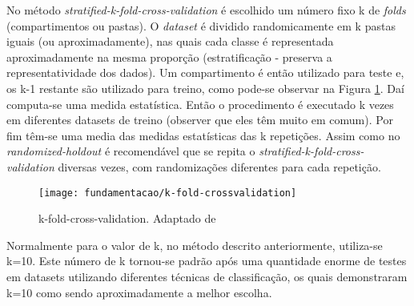 No método \textit{stratified-k-fold-cross-validation} é escolhido um número fixo k de \textit{folds} (compartimentos ou pastas). O \textit{dataset} é dividido randomicamente em k pastas iguais (ou aproximadamente), nas quais cada classe é representada aproximadamente na mesma proporção (estratificação - preserva a representatividade dos dados). 
Um compartimento é então utilizado para teste e, os k-1 restante são utilizado para treino, como pode-se observar na Figura \ref{fig:kfoldcrossvalidation}. Daí computa-se uma medida estatística. Então o procedimento é executado k vezes em diferentes datasets de treino (observer que eles têm muito em comum). Por fim têm-se uma media das medidas estatísticas das k repetições. Assim como no \textit{randomized-holdout} é recomendável que se repita o \textit{stratified-k-fold-cross-validation} diversas vezes, com randomizações diferentes para cada repetição.\cite{Witten:2005}

\begin{figure}[!htb] \centering 
  \centering
  \texttt{[image: fundamentacao/k-fold-crossvalidation]} 
  \caption{k-fold-cross-validation. Adaptado de\cite{Keller}} 
  \label{fig:kfoldcrossvalidation}
\end{figure}

Normalmente para o valor de k, no método descrito anteriormente, utiliza-se k=10. Este número de k tornou-se padrão após uma quantidade enorme de testes em datasets utilizando diferentes técnicas de classificação, os quais demonstraram k=10 como sendo aproximadamente a melhor escolha.\cite{Witten:2005}